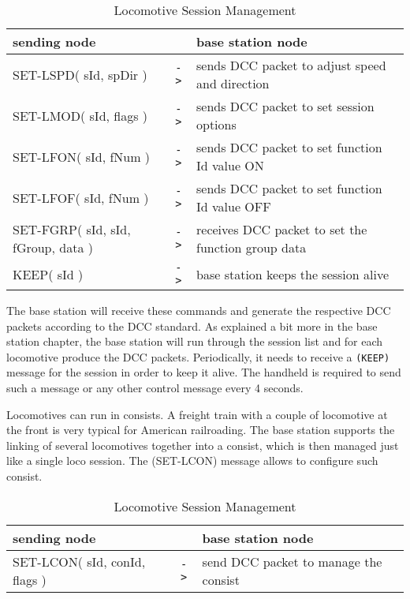 \begin{table}[ht!]
    \begin{center}
        \caption{Locomotive Session Management}
        \begin{tabular}{|p{}| c |p{}|}
            \toprule
            \textbf{sending node} & & \textbf{ base station node } \\
            \midrule
            SET-LSPD( sId, spDir ) & \texttt{->} & sends DCC packet to adjust speed and direction  \\
            SET-LMOD( sId, flags ) & \texttt{->} & sends DCC packet to set session options   \\
            SET-LFON( sId, fNum ) & \texttt{->} & sends DCC packet to set function Id value ON  \\
            SET-LFOF( sId, fNum ) & \texttt{->} & sends DCC packet to set function Id value OFF  \\
            SET-FGRP( sId, sId, fGroup, data ) & \texttt{->} & receives DCC packet to set the function group data  \\
            KEEP( sId ) & \texttt{->} & base station keeps the session alive  \\
            \bottomrule
        \end{tabular}
    \end{center}
\end{table}

The base station will receive these commands and generate the respective DCC packets according to the DCC standard. As explained a bit more in the base station chapter, the base station will run through the session list and for each locomotive produce the DCC packets. Periodically, it needs to receive a \texttt{(KEEP)} message for the session in order to keep it alive. The handheld is required to send such a message or any other control message every 4 seconds.

Locomotives can run in consists. A freight train with a couple of locomotive at the front is very typical for American railroading. The base station supports the linking of several locomotives together into a consist, which is then managed just like a single loco session. The (SET-LCON) message allows to configure such consist.

\begin{table}[ht!]
    \begin{center}
        \caption{Locomotive Session Management}
        \begin{tabular}{|p{}| c |p{}|}
            \toprule
            \textbf{sending node} & & \textbf{ base station node} \\
            \midrule
            SET-LCON( sId, conId, flags ) & \texttt{->} & send DCC packet to manage the consist  \\
            \bottomrule
        \end{tabular}
    \end{center}
\end{table}


